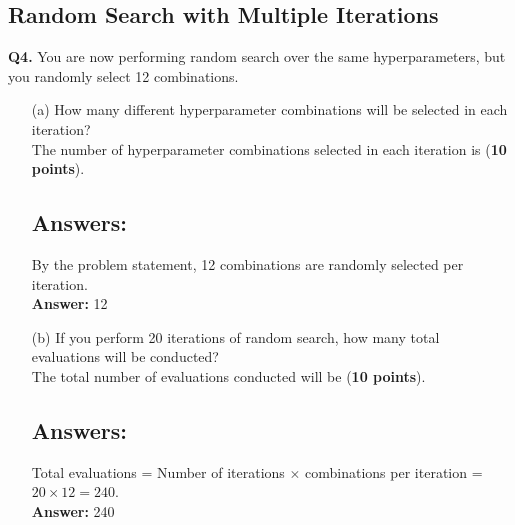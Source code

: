 \documentclass{article}
\begin{document}
\subsection*{Random Search with Multiple Iterations}
\textbf{Q4.} You are now performing random search over the same hyperparameters,
but you randomly select 12 combinations.
\begin{enumerate}
      \item[(a)] How many different hyperparameter combinations will be selected in
            each iteration? \\
            The number of hyperparameter combinations selected in each iteration is \underline{\hspace{3cm}} (\textbf{10 points}).
            \subsection*{Answers:}
            By the problem statement, 12 combinations are randomly selected per iteration. \\
            \textbf{Answer:} 12
      \item[(b)] If you perform 20 iterations of random search, how many total
            evaluations will be conducted? \\
            The total number of evaluations conducted will be \underline{\hspace{3cm}} (\textbf{10 points}).
            \subsection*{Answers:}
            Total evaluations = Number of iterations $\times$ combinations per iteration = $20 \times 12 = 240$. \\
            \textbf{Answer:} 240
\end{enumerate}

\newpage
\end{document}
